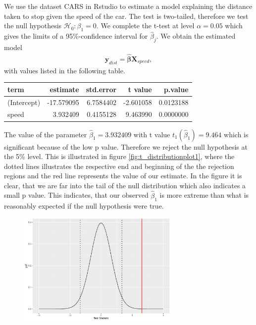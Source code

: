 \begin{example}  \label{ex:ttest}
We use the dataset CARS in Rstudio to estimate a model explaining the distance taken to stop given the speed of the car.
The test is two-tailed, therefore we test the null hypothesis $\mathcal{H}_0:\beta_1=0.$
We complete the t-test at level $\alpha=0.05$ which gives the limits of a 95\%-confidence interval for $\hat{\beta}_j$.
We obtain the estimated model
\begin{align*}
    \textbf{y}_{dist} = \hat{\boldsymbol{\beta}} \boldsymbol{X}_{speed},
\end{align*}
with values listed in the following table.

\begin{table}[H]
\centering
\begin{tabular}{lrrrr}
\toprule
\textbf{term} & \textbf{estimate} & \textbf{std.error} & \textbf{t value} & \textbf{p.value}\\
\midrule
(Intercept) & -17.579095 & 6.7584402 & -2.601058 & 0.0123188\\
speed & 3.932409 & 0.4155128 & 9.463990 & 0.0000000\\
\bottomrule
\end{tabular}
\end{table}
The value of the parameter $\hat{\beta}_1=3.932409$ with t value $t_1(\hat{\beta}_1) = 9.464$ which is significant because of the low p value. 
Therefore we reject the null hypothesis at the 5\% level. This is illustrated in figure \ref{fig:t_distributionplot1}, where the dotted lines illustrates the respective end and beginning of the the rejection regions and the red line represents the value of our estimate. 
In the figure it is clear, that we are far into the tail of the null distribution which also indicates a small p value. 
This indicates, that our observed $\hat{\beta}_1$ is more extreme than what is reasonably expected if the null hypothesis were true.
\begin{figure}[H]
    \centering
    \includegraphics[width = 0.7\textwidth]{figures/Nanna/t_distributionPlot.pdf}

\end{figure}
\end{example}
